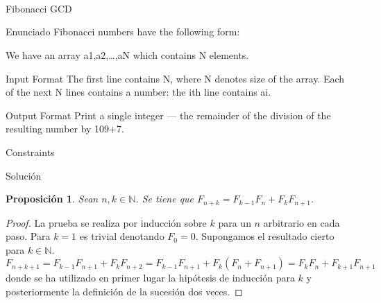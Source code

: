 \documentclass{article}
\title{                                             %
    \vspace{2in}
    \textmd{\textbf{\asignatura \\ \titulo}} \\         %
    \normalsize\vspace{0.1in}\small{\fecha}  \\         %
    \vspace{3in}
}
\author{\textbf{\autor}}                            %
\date{}                                             %
\theoremstyle{theorem-style}  %
\newtheorem{proposition}[theorem]{Proposición}
\theoremstyle{definition}
\theoremstyle{example-style}
\begin{document}
\maketitle



\newpage
\tableofcontents
\newpage

\begin{section}{Fibonacci  GCD}

\begin{subsection}{Enunciado}
Fibonacci numbers have the following form: 


We have an array a1,a2,…,aN which contains N elements.


Input Format 
The first line contains N, where N denotes size of the array. 
Each of the next N lines contains a number: the ith line contains ai.

Output Format 
Print a single integer — the remainder of the division of the resulting number by 109+7.

Constraints 

\end{subsection}

    \begin{subsection}{Solución}
    
        \begin{proposition}
            Sean $n, k \in \mathbb{N}$. Se tiene que $F_{n+k} = F_{k-1}F_n + F_k F_{n+1}$. 
        \end{proposition}
        
        \begin{proof}
            La prueba se realiza por inducción sobre $k$ para un $n$ arbitrario en cada paso. Para $k=1$ es trivial denotando $F_0 = 0$. Supongamos el resultado cierto para $k \in \mathbb{N}$. 
            $$ F_{n+k+1} = F_{k-1}F_{n+1} + F_k F_{n+2} = F_{k-1}F_{n+1} + F_k (F_{n} + F_{n+1}) = F_{k}F_n + F_{k+1} F_{n+1} $$
            donde se ha utilizado en primer lugar la hipótesis de inducción para $k$ y posteriormente la definición de la sucesión dos veces.
        \end{proof}


\end{subsection}
\end{section}
\end{document}
